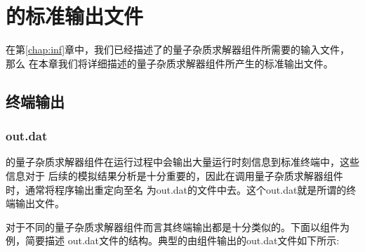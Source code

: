 \chapter{{\iqist}的标准输出文件}
\label{chap:out}

在第\ref{chap:inf}章中，我们已经描述了{\iqist}的量子杂质求解器组件所需要的输入文件，那么
在本章我们将详细描述{\iqist}的量子杂质求解器组件所产生的标准输出文件。

\section{终端输出}
\label{sec:terminal}

\subsection{out.dat}
\iqist 的量子杂质求解器组件在运行过程中会输出大量运行时刻信息到标准终端中，这些信息对于
后续的模拟结果分析是十分重要的，因此在调用量子杂质求解器组件时，通常将程序输出重定向至名
为out.dat的文件中去。这个out.dat就是所谓的终端输出文件。

对于不同的量子杂质求解器组件而言其终端输出都是十分类似的。下面以{\azalea}组件为例，简要描述
out.dat文件的结构。典型的由{\azalea}组件输出的out.dat文件如下所示:

